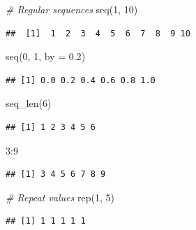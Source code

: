 \documentclass[
]{book}
\newenvironment{Shaded}{\begin{snugshade}}{\end{snugshade}}
\newcommand{\AttributeTok}[1]{\textcolor[rgb]{0.77,0.63,0.00}{#1}}
\newcommand{\CommentTok}[1]{\textcolor[rgb]{0.56,0.35,0.01}{\textit{#1}}}
\newcommand{\DecValTok}[1]{\textcolor[rgb]{0.00,0.00,0.81}{#1}}
\newcommand{\FloatTok}[1]{\textcolor[rgb]{0.00,0.00,0.81}{#1}}
\newcommand{\FunctionTok}[1]{\textcolor[rgb]{0.00,0.00,0.00}{#1}}
\newcommand{\NormalTok}[1]{#1}
\newcommand{\SpecialCharTok}[1]{\textcolor[rgb]{0.00,0.00,0.00}{#1}}
\begin{document}
\begin{Shaded}
\begin{Highlighting}[]
\CommentTok{\# Regular sequences}
\FunctionTok{seq}\NormalTok{(}\DecValTok{1}\NormalTok{, }\DecValTok{10}\NormalTok{)}
\end{Highlighting}
\end{Shaded}

\begin{verbatim}
##  [1]  1  2  3  4  5  6  7  8  9 10
\end{verbatim}

\begin{Shaded}
\begin{Highlighting}[]
\FunctionTok{seq}\NormalTok{(}\DecValTok{0}\NormalTok{, }\DecValTok{1}\NormalTok{, }\AttributeTok{by =} \FloatTok{0.2}\NormalTok{)}
\end{Highlighting}
\end{Shaded}

\begin{verbatim}
## [1] 0.0 0.2 0.4 0.6 0.8 1.0
\end{verbatim}

\begin{Shaded}
\begin{Highlighting}[]
\FunctionTok{seq\_len}\NormalTok{(}\DecValTok{6}\NormalTok{)}
\end{Highlighting}
\end{Shaded}

\begin{verbatim}
## [1] 1 2 3 4 5 6
\end{verbatim}

\begin{Shaded}
\begin{Highlighting}[]
\DecValTok{3}\SpecialCharTok{:}\DecValTok{9}
\end{Highlighting}
\end{Shaded}

\begin{verbatim}
## [1] 3 4 5 6 7 8 9
\end{verbatim}

\begin{Shaded}
\begin{Highlighting}[]
\CommentTok{\# Repeat values}
\FunctionTok{rep}\NormalTok{(}\DecValTok{1}\NormalTok{, }\DecValTok{5}\NormalTok{)}
\end{Highlighting}
\end{Shaded}

\begin{verbatim}
## [1] 1 1 1 1 1
\end{verbatim}
\end{document}
